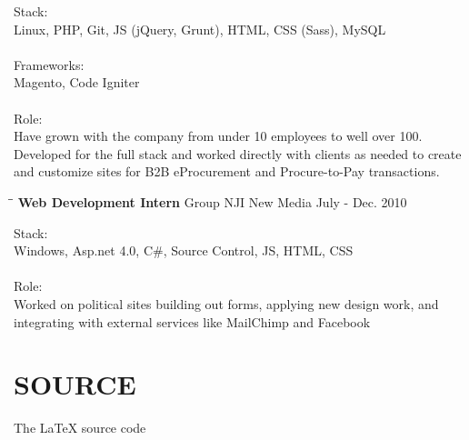 \documentclass{res}
\begin{document}
\begin{resume}
    Stack: \\
	Linux, PHP, Git, JS (jQuery, Grunt), HTML, CSS (Sass), MySQL \\
	\\
	Frameworks: \\
	Magento, Code Igniter \\
	\\
	Role: \\
	Have grown with the company from under 10 employees to well over 100. 
	Developed for the full stack and worked directly with clients as needed to
	create and customize sites for B2B eProcurement and Procure-to-Pay transactions. 
    
   \begin{tabbing}
		\hspace{2.3in}\= \hspace{2.6in}\= \kill %
		\textbf{Web Development Intern} \>Group NJI New Media \> July - Dec. 2010 \\
   \end{tabbing}\vspace{-20pt}
   
    Stack: \\
	Windows, Asp.net 4.0, C\#, Source Control, JS, HTML, CSS \\
	\\
	Role: \\
	Worked on political sites building out forms, applying new design work, and integrating 
	with external services like MailChimp and Facebook\\
	
\section{SOURCE}
	The LaTeX source code
 
\end{resume}
\end{document}
